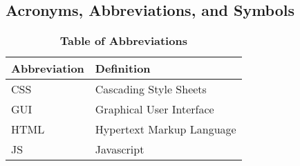 \documentclass[12pt, titlepage]{article}
\begin{document}
\subsection{Acronyms, Abbreviations, and Symbols}

\begin{table}[hbp]
	\caption{\textbf{Table of Abbreviations}} \label{Table}
	
	\begin{tabularx}{\textwidth}{p{3cm}X}
		\toprule
		\textbf{Abbreviation} & \textbf{Definition} \\
		\midrule
		CSS & Cascading Style Sheets\\
		GUI & Graphical User Interface\\
		HTML & Hypertext Markup Language\\
		JS & Javascript\\
		\bottomrule
	\end{tabularx}
	
\end{table}
\end{document}
